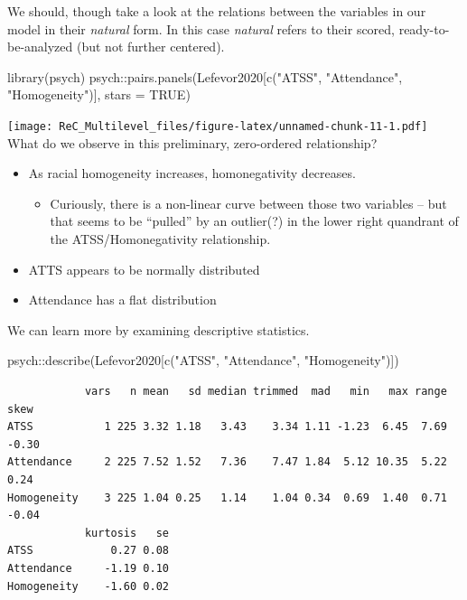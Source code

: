 \documentclass[
  11pt,
]{book}
\newenvironment{Shaded}{\begin{snugshade}}{\end{snugshade}}
\newcommand{\AttributeTok}[1]{\textcolor[rgb]{0.77,0.63,0.00}{#1}}
\newcommand{\ConstantTok}[1]{\textcolor[rgb]{0.00,0.00,0.00}{#1}}
\newcommand{\FunctionTok}[1]{\textcolor[rgb]{0.00,0.00,0.00}{#1}}
\newcommand{\NormalTok}[1]{#1}
\newcommand{\SpecialCharTok}[1]{\textcolor[rgb]{0.00,0.00,0.00}{#1}}
\newcommand{\StringTok}[1]{\textcolor[rgb]{0.31,0.60,0.02}{#1}}
\providecommand{\tightlist}{%
  \setlength{\itemsep}{0pt}\setlength{\parskip}{0pt}}
\begin{document}
We should, though take a look at the relations between the variables in our model in their \emph{natural} form. In this case \emph{natural} refers to their scored, ready-to-be-analyzed (but not further centered).

\begin{Shaded}
\begin{Highlighting}[]
\FunctionTok{library}\NormalTok{(psych)}
\NormalTok{psych}\SpecialCharTok{::}\FunctionTok{pairs.panels}\NormalTok{(Lefevor2020[}\FunctionTok{c}\NormalTok{(}\StringTok{"ATSS"}\NormalTok{, }\StringTok{"Attendance"}\NormalTok{, }\StringTok{"Homogeneity"}\NormalTok{)], }\AttributeTok{stars =} \ConstantTok{TRUE}\NormalTok{)}
\end{Highlighting}
\end{Shaded}

\texttt{[image: ReC\_Multilevel\_files/figure-latex/unnamed-chunk-11-1.pdf]}
What do we observe in this preliminary, zero-ordered relationship?

\begin{itemize}
\tightlist
\item
  As racial homogeneity increases, homonegativity decreases.

  \begin{itemize}
  \tightlist
  \item
    Curiously, there is a non-linear curve between those two variables -- but that seems to be ``pulled'' by an outlier(?) in the lower right quandrant of the ATSS/Homonegativity relationship.
  \end{itemize}
\item
  ATTS appears to be normally distributed
\item
  Attendance has a flat distribution
\end{itemize}

We can learn more by examining descriptive statistics.

\begin{Shaded}
\begin{Highlighting}[]
\NormalTok{psych}\SpecialCharTok{::}\FunctionTok{describe}\NormalTok{(Lefevor2020[}\FunctionTok{c}\NormalTok{(}\StringTok{"ATSS"}\NormalTok{, }\StringTok{"Attendance"}\NormalTok{, }\StringTok{"Homogeneity"}\NormalTok{)])}
\end{Highlighting}
\end{Shaded}

\begin{verbatim}
            vars   n mean   sd median trimmed  mad   min   max range  skew
ATSS           1 225 3.32 1.18   3.43    3.34 1.11 -1.23  6.45  7.69 -0.30
Attendance     2 225 7.52 1.52   7.36    7.47 1.84  5.12 10.35  5.22  0.24
Homogeneity    3 225 1.04 0.25   1.14    1.04 0.34  0.69  1.40  0.71 -0.04
            kurtosis   se
ATSS            0.27 0.08
Attendance     -1.19 0.10
Homogeneity    -1.60 0.02
\end{verbatim}
\end{document}
